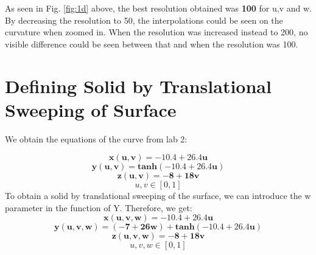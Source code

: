 \documentclass[acmlarge,nonacm=true]{acmart}
\begin{document}
As seen in Fig. \ref{fig:1d} above, the best resolution obtained was \textbf{100} for u,v and w.
By decreasing the resolution to 50, the interpolations could be seen on the curvature when zoomed in. When the resolution was 
increased instead to 200, no visible difference could be seen between that and when the resolution was 100.

\pagebreak
\section{Defining Solid by Translational Sweeping of Surface}
We obtain the equations of the curve from lab 2:

\begin{displaymath}
	\mathbf{x(u,v) = -10.4 + 26.4u}
\end{displaymath}
\begin{displaymath}
	\mathbf{y(u,v) = tanh(-10.4 + 26.4u)}
\end{displaymath}
\begin{displaymath}
	\mathbf{z(u,v) = -8 + 18v}
\end{displaymath}
\begin{displaymath}
	u,v \in [0,1]
\end{displaymath}
To obtain a solid by translational sweeping of the surface, we can introduce the w parameter in the function of Y.
Therefore, we get:\\
\begin{displaymath}
	\mathbf{x(u,v,w) = -10.4 + 26.4u}
\end{displaymath}
\begin{displaymath}
	\mathbf{y(u,v,w) = (-7 + 26w)+tanh(-10.4 + 26.4u)}
\end{displaymath}
\begin{displaymath}
	\mathbf{z(u,v,w) = -8 + 18v}
\end{displaymath}
\begin{displaymath}
	u,v,w \in [0,1]
\end{displaymath}
\end{document}
